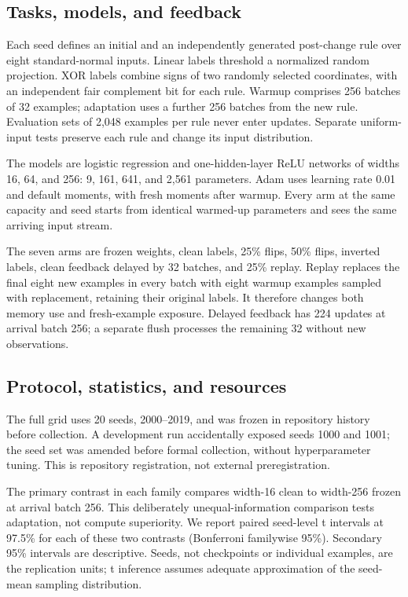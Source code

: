 \documentclass[11pt]{article}
\begin{document}
\subsection{Tasks, models, and feedback}
Each seed defines an initial and an independently generated post-change rule
over eight standard-normal inputs. Linear labels threshold a normalized random
projection. XOR labels combine signs of two randomly selected coordinates,
with an independent fair complement bit for each rule. Warmup comprises 256
batches of 32 examples; adaptation uses a further 256 batches from the new
rule. Evaluation sets of 2,048 examples per rule never enter updates. Separate
uniform-input tests preserve each rule and change its input distribution.

The models are logistic regression and one-hidden-layer ReLU networks of
widths 16, 64, and 256: 9, 161, 641, and 2,561 parameters. Adam uses learning
rate 0.01 and default moments, with fresh moments after warmup. Every arm at
the same capacity and seed starts from identical warmed-up parameters and
sees the same arriving input stream.

The seven arms are frozen weights, clean labels, 25\% flips, 50\% flips,
inverted labels, clean feedback delayed by 32 batches, and 25\% replay.
Replay replaces the final eight new examples in every batch with eight
warmup examples sampled with replacement, retaining their original labels.
It therefore changes both memory use and fresh-example exposure. Delayed
feedback has 224 updates at arrival batch 256; a separate flush processes
the remaining 32 without new observations.

\subsection{Protocol, statistics, and resources}
The full grid uses 20 seeds, 2000--2019, and was frozen in repository history
before collection. A development run accidentally exposed seeds 1000 and 1001;
the seed set was amended before formal collection, without hyperparameter
tuning. This is repository registration, not external preregistration.

The primary contrast in each family compares width-16 clean to width-256
frozen at arrival batch 256. This deliberately unequal-information comparison
tests adaptation, not compute superiority. We report paired seed-level t
intervals at 97.5\% for each of these two contrasts (Bonferroni familywise
95\%). Secondary 95\% intervals are descriptive. Seeds, not checkpoints or
individual examples, are the replication units; t inference assumes adequate
approximation of the seed-mean sampling distribution.
\end{document}

